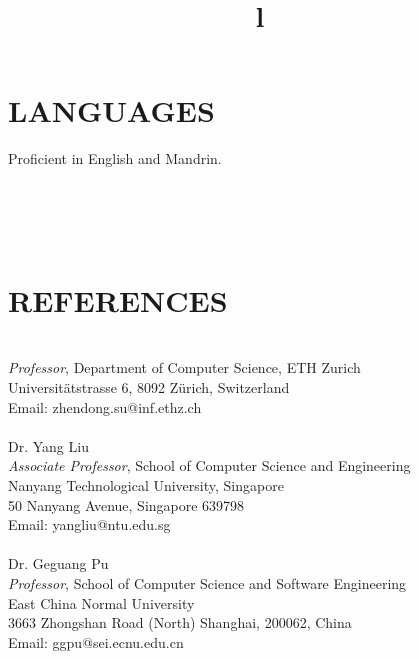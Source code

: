 \documentclass[margin]{res}
\begin{document}
\begin{resume}
\section{LANGUAGES}
Proficient in English and Mandrin.

\begin{format}
\title{l}\\
\\
\body\\
\end{format}





\section{REFERENCES}

\\
\emph{Professor}, Department of Computer Science, ETH Zurich\\
Universitätstrasse 6, 8092 Zürich, Switzerland\\
Email: zhendong.su@inf.ethz.ch\\
\\
Dr. Yang Liu\\
\emph{Associate Professor}, School of Computer Science and Engineering\\
Nanyang Technological University, Singapore\\
50 Nanyang Avenue, Singapore 639798\\
Email: yangliu@ntu.edu.sg \\
\\
Dr. Geguang Pu \\
\emph{Professor}, School of Computer Science and Software Engineering\\
East China Normal University\\
3663 Zhongshan Road (North) Shanghai, 200062, China \\
Email: ggpu@sei.ecnu.edu.cn\\






\end{resume}
\(\)
\end{document}
